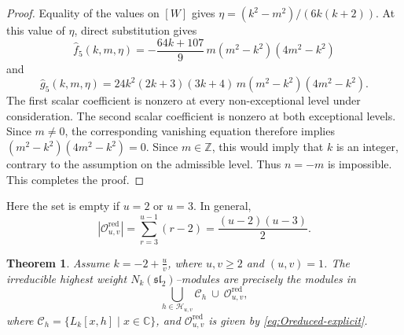 \documentclass[11 pt]{amsart}
\newtheorem{theorem}{Theorem}
\theoremstyle{definition}
\theoremstyle{plain}
\begin{document}
\begin{proof}
Equality of the values on $[W]$ gives
$\eta=(k^2-m^2)/(6k(k+2))$.
At this value of $\eta$, direct substitution gives
\[
\widehat f_5(k,m,\eta)
=-\frac{64k+107}{9}\,
m(m^2-k^2)(4m^2-k^2)
\]
and
\[
\widehat g_5(k,m,\eta)
=24k^2(2k+3)(3k+4)\,
m(m^2-k^2)(4m^2-k^2).
\]
The first scalar coefficient is nonzero at every non-exceptional level
under consideration. The second scalar coefficient is nonzero at both
exceptional levels. Since $m\neq0$, the corresponding vanishing equation
therefore implies $(m^2-k^2)(4m^2-k^2)=0$.
Since $m\in\mathbb Z$, this would imply that $k$ is an integer,
contrary to the assumption on the admissible level. Thus $n=-m$ is
impossible. This completes the proof.
\end{proof}

Here the set is empty if $u=2$ or $u=3$.  In general,
\begin{equation}\label{eq:Oreduced-cardinality}
  |\mathcal O^{\mathrm{red}}_{u,v}|
  =\sum_{r=3}^{u-1}(r-2)
  =\frac{(u-2)(u-3)}{2}.
\end{equation}


\begin{theorem}\label{thm:admissible-classification}
Assume $k=-2+\frac{u}{v}$, where $u,v\ge2$ and $(u,v)=1$.
The irreducible highest weight $N_k(\mathfrak{sl}_2)$--modules are precisely the modules in
\[
  \bigcup_{h\in\mathcal H_{u,v}}
  \mathcal C_h
  \ \cup\
  \mathcal O^{\mathrm{red}}_{u,v},
\]
where
$\mathcal C_h=\{L_k[x,h]\mid x\in\mathbb C\}$,
and $\mathcal O^{\mathrm{red}}_{u,v}$ is given by
\eqref{eq:Oreduced-explicit}.
\end{theorem}
\end{document}
